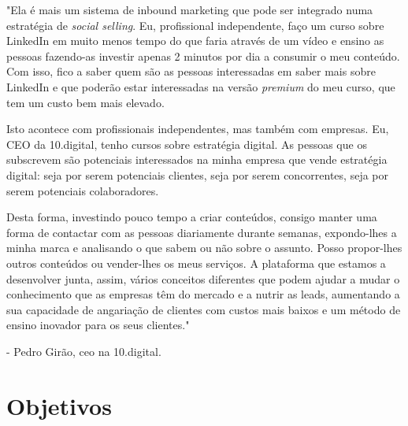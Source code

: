 \begin{displayquote}
"Ela é mais um sistema de inbound marketing que pode ser integrado numa estratégia de \textit{\gls{social selling}}. Eu, profissional independente, faço um curso sobre LinkedIn\cite{linkedin} em muito menos tempo do que faria através de um vídeo e ensino as pessoas fazendo-as investir apenas 2 minutos por dia a consumir o meu conteúdo. Com isso, fico a saber quem são as pessoas interessadas em saber mais sobre LinkedIn e que poderão estar interessadas na versão \textit{premium} do meu curso, que tem um custo bem mais elevado.

Isto acontece com profissionais independentes, mas também com empresas. Eu, CEO da 10.digital, tenho cursos sobre estratégia digital. As pessoas que os subscrevem são potenciais interessados na minha empresa que vende estratégia digital: seja por serem potenciais clientes, seja por serem concorrentes, seja por serem potenciais colaboradores.

Desta forma, investindo pouco tempo a criar conteúdos, consigo manter uma forma de contactar com as pessoas diariamente durante semanas, expondo-lhes a minha marca e analisando o que sabem ou não sobre o assunto.
Posso propor-lhes outros conteúdos ou vender-lhes os meus serviços. A plataforma que estamos a desenvolver junta, assim, vários conceitos diferentes que podem ajudar a mudar o conhecimento que as empresas têm do mercado e a nutrir as leads, aumentando a sua capacidade de angariação de clientes com custos mais baixos e um método de ensino inovador para os seus clientes." 

- Pedro Girão, \acrfull{ceo} na 10.digital.
\end{displayquote}

\section{Objetivos}
\label{subsec:objetivos}

